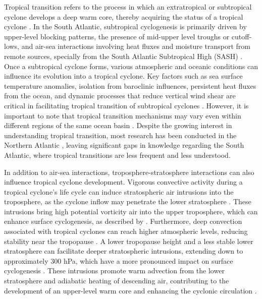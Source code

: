 \documentclass[pdflatex,sn-chicago]{sn-jnl}%
\theoremstyle{plain}
\theoremstyle{definition}
\theoremstyle{remark}
\theoremstyle{definition}
\begin{document}
Tropical transition refers to the process in which an extratropical or subtropical cyclone develops a deep warm core, thereby acquiring the status of a tropical cyclone \citep{davis2003baroclinically,wood2023phase}. In the South Atlantic, subtropical cyclogenesis is primarily driven by upper-level blocking patterns, the presence of mid-upper level troughs or cutoff-lows, and air-sea interactions involving heat fluxes and moisture transport from remote sources, specially from the South Atlantic Subtropical High (SASH) \citep{gozzo2014subtropical,gozzo2017climatology}. Once a subtropical cyclone forms, various atmospheric and oceanic conditions can influence its evolution into a tropical cyclone. Key factors such as sea surface temperature anomalies, isolation from baroclinic influences, persistent heat fluxes from the ocean, and dynamic processes that reduce vertical wind shear are critical in facilitating tropical transition of subtropical cyclones \citep{da2019subtropical}. However, it is important to note that tropical transition mechanisms may vary even within different regions of the same ocean basin \citep{wood2023phase}. Despite the growing interest in understanding tropical transition, most research has been conducted in the Northern Atlantic \citep{wood2023phase}, leaving significant gaps in knowledge regarding the South Atlantic, where tropical transitions are less frequent and less understood.

In addition to air-sea interactions, troposphere-stratosphere interactions can also influence tropical cyclone development. Vigorous convective activity during a tropical cyclone's life cycle can induce stratospheric air intrusions into the troposphere, as the cyclone inflow may penetrate the lower stratosphere \citep{moon2017impacts,barnes2022stratospheric,ohno2015warm}. These intrusions bring high potential vorticity air into the upper troposphere, which can enhance surface cyclogenesis, as described by \citet{hoskins1985use}. Furthermore, deep convection associated with tropical cyclones can reach higher atmospheric levels, reducing stability near the tropopause \citep{zhan2012contribution,baray1999tropical}.  A lower tropopause height and a less stable lower stratosphere can facilitate deeper stratospheric intrusions, extending down to approximately 300 hPa, which have a more pronounced impact on surface cyclogenesis \citep{ferrara2017large,moon2017impacts,barnes2022stratospheric}. These intrusions promote warm advection from the lower stratosphere and adiabatic heating of descending air, contributing to the development of an upper-level warm core and enhancing the cyclonic circulation \citep{ohno2015warm,moon2017impacts}.
\end{document}
